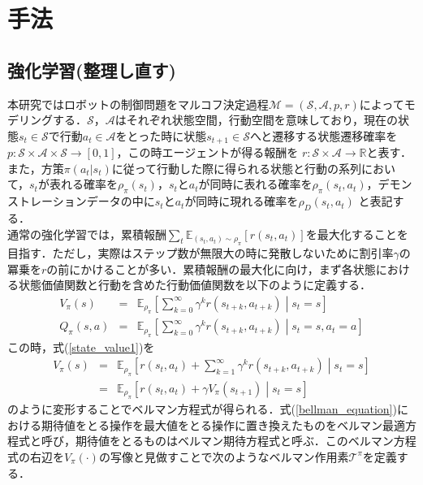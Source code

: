 \documentclass[dvipdfmx]{ampbt_nomag}
\begin{document}
\clearpage
\section{手法}\label{sec-method}
\subsection{強化学習(整理し直す)}
本研究ではロボットの制御問題をマルコフ決定過程$\mathcal{M} = (\mathcal{S},\mathcal{A},p,r)$によってモデリングする．$\mathcal{S}$，$\mathcal{A}$はそれぞれ状態空間，行動空間を意味しており，現在の状態$s_t \in \mathcal{S}$で行動$a_t \in \mathcal{A}$をとった時に状態$s_{t+1}\in\mathcal{S}$へと遷移する状態遷移確率を$ p:\mathcal{S}\times\mathcal{A}\times\mathcal{S}\rightarrow[0,1]$，この時エージェントが得る報酬を $r:\mathcal{S}\times\mathcal{A}\rightarrow\mathbb{R}$と表す．また，方策$\pi(a_t|s_t)$に従って行動した際に得られる状態と行動の系列において，$s_t$が表れる確率を$\rho_\pi(s_t)$，$s_t$と$a_t$が同時に表れる確率を$\rho_\pi(s_t,a_t)$，デモンストレーションデータの中に$s_t$と$a_t$が同時に現れる確率を$\rho_D(s_t,a_t)$ と表記する．\\
通常の強化学習では，累積報酬$\sum_t \mathbb{E}_{(s_t,a_t)\sim\rho_\pi}[r(s_t, a_t)]$を最大化することを目指す．ただし，実際はステップ数が無限大の時に発散しないために割引率$\gamma$の冪乗を$r$の前にかけることが多い．累積報酬の最大化に向け，まず各状態における状態価値関数と行動を含めた行動価値関数を以下のように定義する．
\begin{eqnarray} \label{state_value1}
  V_\pi(s) &=& \mathbb{E}_{\rho_\pi} \left[\sum^{\infty}_{k=0}\gamma^kr(s_{t+k},a_{t+k}) \middle|s_t = s\right] \\
  \label{state_value2}
  Q_\pi(s,a) &=& \mathbb{E}_{\rho_\pi} \left[\sum^{\infty}_{k=0}\gamma^kr(s_{t+k},a_{t+k}) \middle|s_t = s, a_t = a \right]
\end{eqnarray}
この時，式(\ref{state_value1})を
\begin{eqnarray} \label{bellman_equation}
  V_\pi(s) &=& \mathbb{E}_{\rho_\pi} \left[ r(s_t,a_t) + \sum^{\infty}_{k=1} \gamma^{k}r(s_{t+k},a_{t+k}) \middle|s_t = s\right] \\ \nonumber
  &=& \mathbb{E}_{\rho_\pi} \left[ r(s_t,a_t) + \gamma V_\pi(s_{t+1}) \middle|s_t = s\right]
\end{eqnarray}
のように変形することでベルマン方程式が得られる．式(\ref{bellman_equation})における期待値をとる操作を最大値をとる操作に置き換えたものをベルマン最適方程式と呼び，期待値をとるものはベルマン期待方程式と呼ぶ．このベルマン方程式の右辺を$V_\pi(\cdot)$の写像と見做すことで次のようなベルマン作用素$\mathcal{T}^\pi$を定義する．
\end{document}
